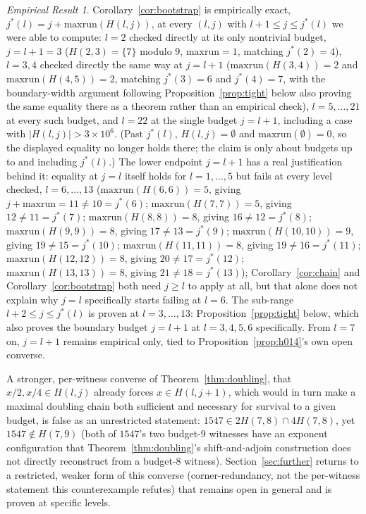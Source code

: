 \documentclass[11pt]{amsart}
\theoremstyle{plain}
\theoremstyle{definition}
\theoremstyle{remark}
\newtheorem{empresult}[theorem]{Empirical Result}
\begin{document}
\begin{empresult}
\label{er:bootstrap}
Corollary~\ref{cor:bootstrap} is empirically exact, $j^*(l) = j + \mathrm{maxrun}(H(l,j))$, at every
$(l,j)$ with $l+1\le j\le j^*(l)$ we were able to compute: $l=2$ checked directly at its only
nontrivial budget, $j=l+1=3$ ($H(2,3)=\{7\}$ modulo $9$,
$\mathrm{maxrun}=1$, matching $j^*(2)=4$), $l=3,4$ checked directly the same way at $j=l+1$
($\mathrm{maxrun}(H(3,4))=2$ and $\mathrm{maxrun}(H(4,5))=2$, matching $j^*(3)=6$ and $j^*(4)=7$, with
the boundary-width argument following Proposition~\ref{prop:tight} below also proving the same
equality there as a theorem rather than an empirical check), $l=5,\dots,21$ at every such budget, and
$l=22$ at the single budget $j=l+1$, including a case with $|H(l,j)| > 3\times10^6$. (Past
$j^*(l)$, $H(l,j)=\emptyset$ and $\mathrm{maxrun}(\emptyset)=0$, so the displayed equality no longer
holds there; the claim is only about budgets up to and including $j^*(l)$.) The lower endpoint
$j=l+1$ has a real justification behind it: equality at $j=l$ itself holds for $l=1,\dots,5$ but
fails at every level checked, $l=6,\dots,13$ ($\mathrm{maxrun}(H(6,6))=5$, giving
$j+\mathrm{maxrun}=11\ne10=j^*(6)$;
$\mathrm{maxrun}(H(7,7))=5$, giving $12\ne11=j^*(7)$; $\mathrm{maxrun}(H(8,8))=8$, giving
$16\ne12=j^*(8)$; $\mathrm{maxrun}(H(9,9))=8$, giving $17\ne13=j^*(9)$;
$\mathrm{maxrun}(H(10,10))=9$, giving $19\ne15=j^*(10)$; $\mathrm{maxrun}(H(11,11))=8$, giving
$19\ne16=j^*(11)$; $\mathrm{maxrun}(H(12,12))=8$, giving $20\ne17=j^*(12)$;
$\mathrm{maxrun}(H(13,13))=8$, giving $21\ne18=j^*(13)$); Corollary~\ref{cor:chain} and
Corollary~\ref{cor:bootstrap} both need $j\ge l$ to apply at all, but that alone does not explain why
$j=l$ specifically starts failing at $l=6$. The sub-range $l+2\le j\le j^*(l)$ is proven at
$l=3,\dots,13$: Proposition~\ref{prop:tight} below, which also proves the boundary
budget $j=l+1$ at $l=3,4,5,6$ specifically. From $l=7$ on, $j=l+1$ remains empirical only, tied to
Proposition~\ref{prop:h014}'s own open converse.
\end{empresult}

A stronger, per-witness converse of Theorem~\ref{thm:doubling}, that $x/2,x/4\in H(l,j)$ already
forces $x\in H(l,j+1)$, which would in turn make a maximal doubling chain both sufficient and
necessary for survival to a given budget, is false as an unrestricted statement:
$1547 \in 2H(7,8)\cap4H(7,8)$, yet $1547 \notin H(7,9)$ (both of $1547$'s two
budget-$9$ witnesses have an exponent configuration that Theorem~\ref{thm:doubling}'s
shift-and-adjoin construction does not directly reconstruct from a budget-$8$ witness).
Section~\ref{sec:further} returns to a restricted, weaker form
of this converse (corner-redundancy, not the per-witness statement this counterexample refutes) that
remains open in general and is proven at specific levels.
\end{document}
